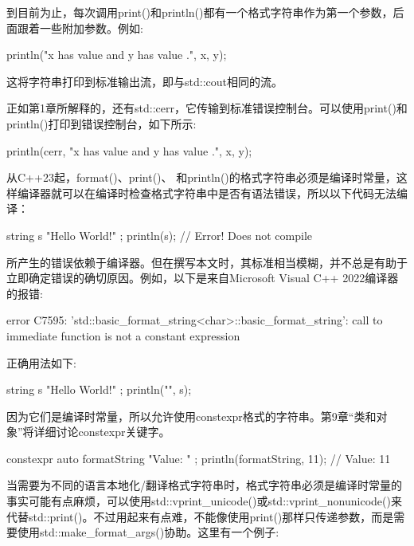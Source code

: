 到目前为止，每次调用print()和println()都有一个格式字符串作为第一个参数，后面跟着一些附加参数。例如:

\begin{cpp}
println("x has value {} and y has value {}.", x, y);
\end{cpp}

这将字符串打印到标准输出流，即与std::cout相同的流。

正如第1章所解释的，还有std::cerr，它传输到标准错误控制台。可以使用print()和println()打印到错误控制台，如下所示:

\begin{cpp}
println(cerr, "x has value {} and y has value {}.", x, y);
\end{cpp}



从C++23起，format()、print()、 和println()的格式字符串必须是编译时常量，这样编译器就可以在编译时检查格式字符串中是否有语法错误，所以以下代码无法编译：

\begin{cpp}
string s { "Hello World!" };
println(s); // Error! Does not compile
\end{cpp}

所产生的错误依赖于编译器。但在撰写本文时，其标准相当模糊，并不总是有助于立即确定错误的确切原因。例如，以下是来自Microsoft Visual C++ 2022编译器的报错:

\begin{shell}
error C7595: 'std::basic_format_string<char>::basic_format_string': call to immediate function is not a constant expression
\end{shell}

正确用法如下:

\begin{cpp}
string s { "Hello World!" };
println("{}", s);
\end{cpp}

因为它们是编译时常量，所以允许使用constexpr格式的字符串。第9章“类和对象”将详细讨论constexpr关键字。

\begin{cpp}
constexpr auto formatString { "Value: {}" };
println(formatString, 11); // Value: 11
\end{cpp}


当需要为不同的语言本地化/翻译格式字符串时，格式字符串必须是编译时常量的事实可能有点麻烦，可以使用std::vprint\_unicode()或std::vprint\_nonunicode()来代替std::print()。不过用起来有点难，不能像使用print()那样只传递参数，而是需要使用std::make\_format\_args()协助。这里有一个例子:

